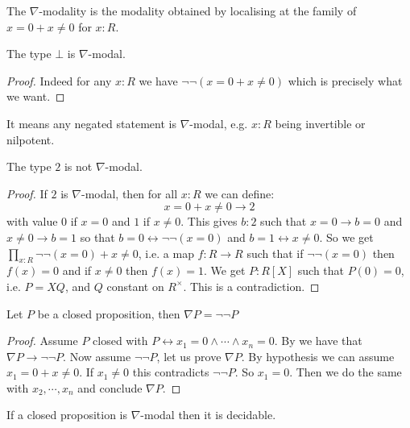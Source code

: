 \begin{definition}
The $\nabla$-modality is the modality obtained by localising at the family of $x=0+x\not=0$ for $x:R$.
\end{definition}

\begin{lemma}\label{bot-nabla-modal}
The type $\bot$ is $\nabla$-modal.
\end{lemma}

\begin{proof}
Indeed for any $x:R$ we have $\neg\neg(x=0 + x\not=0)$ which is precisely what we want.
\end{proof}

\begin{remark}
It means any negated statement is $\nabla$-modal, e.g. $x:R$ being invertible or nilpotent.
\end{remark}

\begin{lemma}
The type $2$ is not $\nabla$-modal.
\end{lemma}

\begin{proof}
If $2$ is $\nabla$-modal, then for all $x:R$ we can define:
\[x=0+x\not=0\to 2\]
with value $0$ if $x=0$ and $1$ if $x\not=0$. This gives $b:2$ such that $x=0 \to b=0$ and $x\not=0\to b=1$ so that $b=0 \leftrightarrow \neg\neg(x=0)$ and $b=1\leftrightarrow x\not=0$. So we get $\prod_{x:R} \neg\neg(x=0)+x\not=0$, i.e. a map $f:R\to R$ such that if $\neg\neg(x=0)$ then $f(x)=0$ and if $x\not=0$ then $f(x)=1$. We get $P:R[X]$ such that $P(0)=0$, i.e. $P = XQ$, and $Q$ constant on $R^\times$. This is a contradiction.
\end{proof}

\begin{lemma}\label{nabla-closed-not-not}
Let $P$ be a closed proposition, then $\nabla P = \neg\neg P$
\end{lemma}

\begin{proof}
Assume $P$ closed with $P \leftrightarrow x_1=0\land\cdots\land x_n=0$. By  we have that $\nabla P\to \neg\neg P$. Now assume $\neg\neg P$, let us prove $\nabla P$. By hypothesis we can assume $x_1=0+x\not=0$. If $x_1\not=0$ this contradicts $\neg\neg P$. So $x_1=0$. Then we do the same with $x_2,\cdots,x_n$ and conclude $\nabla P$.
\end{proof}

\begin{lemma}\label{closed-not-nabla}
If a closed proposition is $\nabla$-modal then it is decidable.
\end{lemma}

